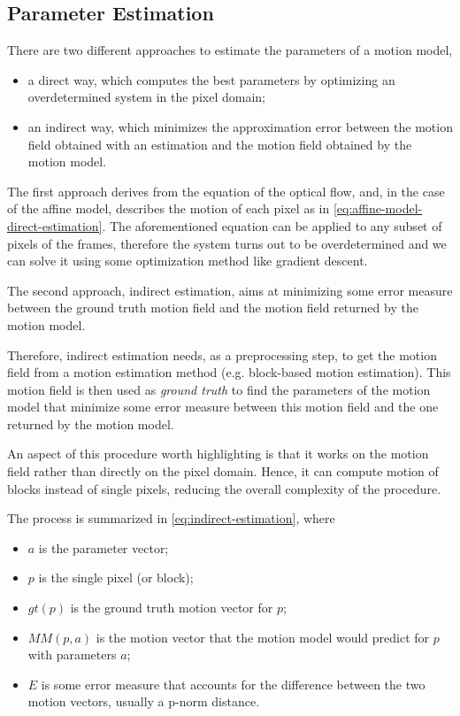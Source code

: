 

\subsection{Parameter Estimation}
There are two different approaches to estimate the parameters of a motion model,
\begin{itemize}
    \item a direct way, which computes the best parameters by optimizing an overdetermined system in the pixel domain;
    \item an indirect way, which minimizes the approximation error between the motion field obtained with an estimation and the motion field obtained by the motion model.
\end{itemize}

The first approach derives from the equation of the optical flow, and, in the case of the affine model, describes the motion of each pixel as in \cref{eq:affine-model-direct-estimation}.
The aforementioned equation can be applied to any subset of pixels of the frames, therefore the system turns out to be overdetermined and we can solve it using some optimization method like gradient descent.

The second approach, indirect estimation, aims at minimizing some error measure between the ground truth motion field and the motion field returned by the motion model.

Therefore, indirect estimation needs, as a preprocessing step, to get the motion field from a motion estimation method (e.g. block-based motion estimation). This motion field is then used as \textit{ground truth} to find the parameters of the motion model that minimize some error measure between this motion field and the one returned by the motion model.

An aspect of this procedure worth highlighting is that it works on the motion field rather than directly on the pixel domain. Hence, it can compute motion of blocks instead of single pixels, reducing the overall complexity of the procedure.

The process is summarized in \cref{eq:indirect-estimation}, where
\begin{itemize}
    \item $a$ is the parameter vector;
    \item $p$ is the single pixel (or block);
    \item $gt(p)$ is the ground truth motion vector for $p$;
    \item $MM(p,a)$ is the motion vector that the motion model would predict for $p$ with parameters $a$;
    \item $E$ is some error measure that accounts for the difference between the two motion vectors, usually a p-norm distance.
\end{itemize}

